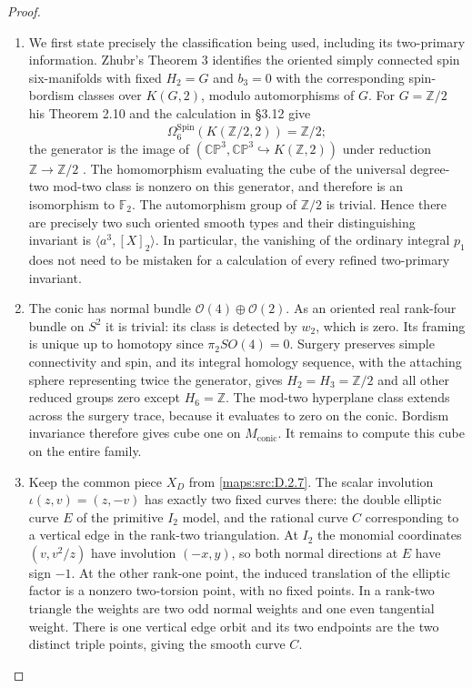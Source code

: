 \begin{proof}
\begin{enumerate}[label=\arabic*.,leftmargin=*]
\item We first state precisely the classification being used, including
its two-primary information. Zhubr's Theorem 3 identifies the
oriented simply connected spin six-manifolds with fixed $H_2=G$
and $b_3=0$ with the corresponding spin-bordism classes over
$K(G,2)$, modulo automorphisms of $G$.
For $G=\mathbb Z/2$ his Theorem 2.10 and the calculation in
\S3.12 give
\[
 \Omega^{\mathrm{Spin}}_6(K(\mathbb Z/2,2))=\mathbb Z/2;
\]
the generator is the image of
$(\mathbb {CP}^3,\mathbb {CP}^3\hookrightarrow
K(\mathbb Z,2))$ under reduction $\mathbb Z\to\mathbb Z/2$
\cite[Theorems 3, 2.10, pp.795,803, and \S3.12, p.807]{manZhubr75}.
The homomorphism evaluating the cube of the universal
degree-two mod-two class is nonzero on this generator, and
therefore is an isomorphism to $\mathbb F_2$.
The automorphism group of $\mathbb Z/2$ is trivial. Hence there
are precisely two such oriented smooth types and their
distinguishing invariant is $\langle a^3,[X]_2\rangle$.
In particular, the vanishing of the ordinary integral $p_1$
does not need to be mistaken for a calculation of every refined
two-primary invariant.

\item The conic has normal bundle $\mathcal O(4)\oplus\mathcal O(2)$.
As an oriented real rank-four bundle on $S^2$ it is trivial:
its class is detected by $w_2$, which is zero. Its framing is
unique up to homotopy since $\pi_2SO(4)=0$.
Surgery preserves simple connectivity and spin, and its integral
homology sequence, with the attaching sphere representing twice
the generator, gives $H_2=H_3=\mathbb Z/2$ and all other reduced
groups zero except $H_6=\mathbb Z$.
The mod-two hyperplane class extends across the surgery trace,
because it evaluates to zero on the conic. Bordism invariance
therefore gives cube one on $M_{\mathrm{conic}}$.
It remains to compute this cube on the entire family.

\item Keep the common piece $X_D$ from \ref{maps:src:D.2.7}. The scalar involution
$\iota(z,v)=(z,-v)$ has exactly two fixed curves there: the
double elliptic curve $E$ of the primitive $I_2$ model, and the
rational curve $C$ corresponding to a vertical edge in the
rank-two triangulation. At $I_2$ the monomial coordinates
$(v,v^2/z)$ have involution $(-x,y)$, so both normal directions
at $E$ have sign $-1$. At the other rank-one point, the induced
translation of the elliptic factor is a nonzero two-torsion
point, with no fixed points. In a rank-two triangle the weights
are two odd normal weights and one even tangential weight.
There is one vertical edge orbit and its two endpoints are the
two distinct triple points, giving the smooth curve $C$.


\end{enumerate}
\end{proof}
